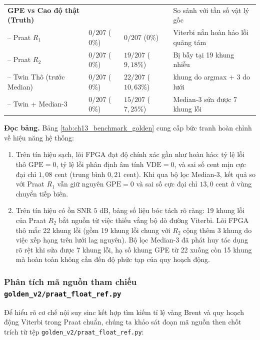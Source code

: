 \begin{table}[htbp]
\begin{tabularx}{\linewidth}{>{\raggedright\arraybackslash}p{3.8cm}>{\raggedright\arraybackslash}p{3.3cm}>{\raggedright\arraybackslash}p{3.5cm}>{\raggedright\arraybackslash}X}
\midrule
\textbf{GPE vs Cao độ thật (Truth)} & & & So sánh với tần số vật lý gốc \\
-- Praat $R_1$ & $0/207$ ($0\%$) & $0/207$ ($0\%$) & Viterbi nắn hoàn hảo lỗi quãng tám \\
-- Praat $R_2$ & $0/207$ ($0\%$) & $19/207$ ($9{,}18\%$) & Bị bẫy tại 19 khung nhiễu \\
-- Twin Thô (trước Median) & $0/207$ ($0\%$) & $22/207$ ($10{,}63\%$) & 19 khung do argmax + 3 do lưới \\
-- Twin + Median-3 & $0/207$ ($0\%$) & $15/207$ ($7{,}25\%$) & Median-3 sửa được 7 khung lỗi \\
\bottomrule
\end{tabularx}
\end{table}

\textbf{Đọc bảng.} Bảng \ref{tab:ch13_benchmark_golden} cung cấp bức tranh hoàn chỉnh về hiệu năng hệ thống:
\begin{enumerate}
    \item Trên tín hiệu sạch, lõi FPGA đạt độ chính xác gần như hoàn hảo: tỷ lệ lỗi thô $\text{GPE} = 0$, tỷ lệ lỗi phân định âm tính $\text{VDE} = 0$, và sai số cent mịn cực đại chỉ $1{,}08\text{ cent}$ (trung bình $0{,}21\text{ cent}$). Khi qua bộ lọc Median-3, kết quả so với Praat $R_1$ vẫn giữ nguyên $\text{GPE} = 0$ và sai số cực đại chỉ $13{,}0\text{ cent}$ ở vùng chuyển tiếp biên.
    \item Trên tín hiệu có ồn SNR $5\text{ dB}$, bảng số liệu bóc tách rõ ràng: 19 khung lỗi của Praat $R_2$ bắt nguồn từ việc thiếu vắng bộ dò đường Viterbi. Lõi FPGA thô mắc 22 khung lỗi (gồm 19 khung lỗi chung với $R_2$ cộng thêm 3 khung do việc xếp hạng trên lưới lag nguyên). Bộ lọc Median-3 đã phát huy tác dụng rõ rệt khi sửa được 7 khung lỗi, hạ số khung GPE từ 22 xuống còn 15 khung mà hoàn toàn không cần đến độ phức tạp của quy hoạch động.
\end{enumerate}

\subsubsection*{Phân tích mã nguồn tham chiếu \texttt{golden\_v2/praat\_float\_ref.py}}
Để hiểu rõ cơ chế nội suy sinc kết hợp tìm kiếm tỉ lệ vàng Brent và quy hoạch động Viterbi trong Praat chuẩn, chúng ta khảo sát đoạn mã nguồn then chốt trích từ tệp \texttt{golden\_v2/praat\_float\_ref.py}:

